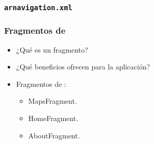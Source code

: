 \begin{frame}
	\frametitle{\texttt{arnavigation.xml}}
	
\end{frame}

\begin{frame}
	\frametitle{Fragmentos de \ULLAR{}}
			\begin{itemize}
				\item ¿Qué es un fragmento?
				\item ¿Qué beneficios ofrecen para la aplicación?
				\item Fragmentos de \ULLAR{}:
				\begin{itemize}
					\item MapsFragment.
					\item HomeFragment.
					\item AboutFragment.
				\end{itemize}
			\end{itemize}
			\endblock{}

\end{frame}

    

